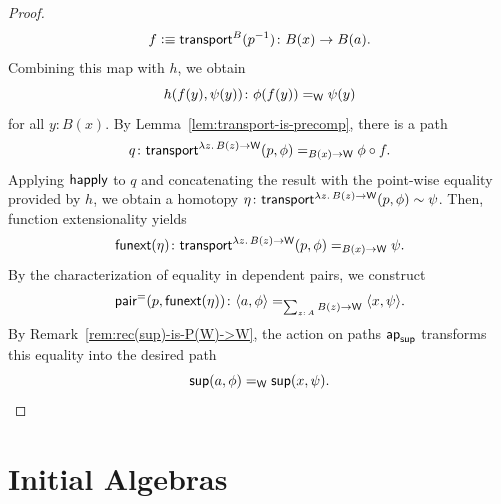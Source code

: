 \begin{proof}
    \[
        f\defeq\fun{transport}^B(p^{-1})\colon B(x)\to B(a).
    \]
    Combining this map with $h$, we obtain
    \[
        h(f(y),\psi(y))\colon
            \phi(f(y))\eq{\fun W}\psi(y)
    \]
    for all $y\colon B(x)$. By Lemma~\ref{lem:transport-is-precomp}, there is a path
    \[
        q\colon
            \fun{transport}^{\lambda z.\,B(z)\to\fun W}
                (p,\phi)
            \eq{B(x)\to\fun W}
            \phi\circ f.
    \]
    Applying $\mathsf{happly}$ to $q$ and concatenating the result with the point-wise equality provided by $h$, we obtain a homotopy $\eta\colon\fun{transport}^{\lambda z.\,B(z)\to\fun W}(p,\phi)\sim\psi$. Then, function extensionality yields
    \[
        \fun{funext}(\eta)\colon
            \fun{transport}^{\lambda z.\,B(z)\to\fun W}(p,\phi)\eq{B(x)\to\fun W}\psi.
    \]
    By the characterization of equality in dependent pairs, we construct
    \[
        \fun{pair}^=(p,\fun{funext}(\eta))\colon
            \dep{a,\phi}
            \eq{\sum_{z\colon A}B(z)\to\fun W}
            \dep{x,\psi}.
    \]
    By Remark~\ref{rem:rec(sup)-is-P(W)->W}, the action on paths $\mathsf{ap}_{\mathsf{sup}}$ transforms this equality into the desired path
    \[
        \mathsf{sup}(a,\phi)\mathrel{=_{\mathsf{W}}}\mathsf{sup}(x,\psi).
    \]
\end{proof}

\preferbreak
\section{Initial Algebras}

